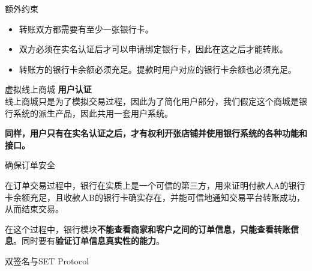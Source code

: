 \documentclass[]{beamer}
\begin{document}
    
    

    \begin{frame}{额外约束}
        \begin{itemize}
            \item 转账双方都需要有至少一张银行卡。
            \item 双方必须在实名认证后才可以申请绑定银行卡，因此在这之后才能转账。
            \item 转账方的银行卡余额必须充足。提款时用户对应的银行卡余额也必须充足。
        \end{itemize}
    \end{frame}

    \begin{frame}{虚拟线上商城}
        \textbf{用户认证} \\
        线上商城只是为了模拟交易过程，因此为了简化用户部分，我们假定这个商城是银行系统的派生产品，因此共用一套用户系统。
    
        \vspace{1em} %
        
        \textbf{同样，用户只有在实名认证之后，才有权利开张店铺并使用银行系统的各种功能和接口。}
    \end{frame}
    
    \begin{frame}{确保订单安全}

        
        \begin{block}{}
            在订单交易过程中，银行在实质上是一个可信的第三方，用来证明付款人A的银行卡余额充足，且收款人B的银行卡确实存在，并能可信地通知交易平台转账成功，从而结束交易。
        \end{block}
    
        \vspace{1em} %
    
        在这个过程中，银行模块\textbf{不能查看商家和客户之间的订单信息，只能查看转账信息}。同时要有\textbf{验证订单信息真实性的能力}。
    
    \end{frame}
    
    
    

    \begin{frame}{双签名与SET Protocol}
        
    \end{frame}
\end{document}
